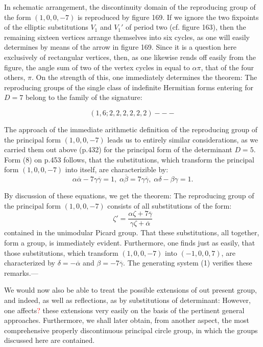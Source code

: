 In schematic arrangement, the discontinuity domain of the reproducing group of the form $(1,0,0,-7)$ is reproduced by figure 169. If we ignore the two fixpoints of the elliptic substitutions $V_1$ and $V_1'$ of period two (cf. figure 163), then the remaining sixteen vertices arrange themselves into six cycles, as one will easily determines by means of the arrow in figure 169. Since it is a question here exclusively of rectangular vertices, then, as one likewise rends off easily from the figure, the angle sum of two of the vertex cycles in equal to $\alpha \pi$, that of the four others, $\pi$. On the strength of this, one immediately determines the theorem: The reproducing groups of the single class of indefinite Hermitian forms entering for $D=7$ belong to the family of the signature:

%
\[
(1,6;2,2,2,2,2,2)---
\]

The approach of the immediate arithmetic definition of the reproducing group of the principal form $(1,0,0,-7)$ leads us to entirely similar considerations, as we carried them out above (p.432) for the principal form of the determinant $D=5$. Form (8) on p.453 follows, that the substitutions, which transform the principal form $(1,0,0,-7)$ into itself, are characterizible by:
\[
\alpha\overline{\alpha}-7\gamma\overline{\gamma}=1,\;\alpha\overline{\beta}=7\gamma\overline{\gamma},\;\alpha\delta-\beta\gamma=1.
\]

By discussion of these equations, we get the theorem: The reproducing group of the principal form $(1,0,0,-7)$ consists of all substitutions of the form:
\begin{equation}
\zeta'=\dfrac{\alpha\zeta+7\overline{\gamma}}{\gamma\zeta+\overline{\alpha}}
\end{equation}
contained in the unimodular Picard group. That these substitutions, all together, form a group, is immediately evident. Furthermore, one finds just as easily, that those substitutions, which transform $(1,0,0,-7)$ into $(-1,0,0,7)$, are characterized by $\delta=-\overline{\alpha}$ and $\beta=-7\overline{\gamma}$. The generating system (1) verifies these remarks.---

We would now also be able to treat the possible extensions of out present group, and indeed, as well as reflections, as by substitutions of determinant: However, one affects\textcolor{red}{?} these extensions very easily on the basis of the pertinent general approaches. Furthermore, we shall later obtain, from another aspect, the most comprehensive properly discontinuous principal circle group, in which the groups discussed here are contained.
